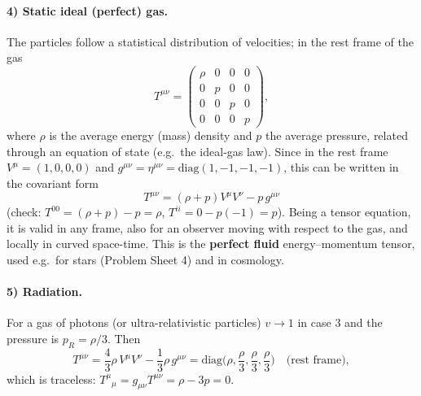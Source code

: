 \paragraph{4) Static ideal (perfect) gas.} The particles follow a statistical distribution of velocities; in the rest frame of the gas
\begin{equation}
  T^{\mu\nu}=\begin{pmatrix}\rho&0&0&0\\0&p&0&0\\0&0&p&0\\0&0&0&p\end{pmatrix},
\end{equation}
where $\rho$ is the average energy (mass) density and $p$ the average pressure, related through an equation of state (e.g.\ the ideal-gas law). Since in the rest frame $V^\mu=(1,0,0,0)$ and $g^{\mu\nu}=\eta^{\mu\nu}=\mathrm{diag}(1,-1,-1,-1)$, this can be written in the covariant form
\begin{equation}
  \boxed{T^{\mu\nu}=(\rho+p)V^\mu V^\nu-p\,g^{\mu\nu}}
\end{equation}
(check: $T^{00}=(\rho+p)-p=\rho$, $T^{ii}=0-p(-1)=p$). Being a tensor equation, it is valid in any frame, also for an observer moving with respect to the gas, and locally in curved space-time. This is the \textbf{perfect fluid} energy--momentum tensor, used e.g.\ for stars (Problem Sheet 4) and in cosmology.

\paragraph{5) Radiation.} For a gas of photons (or ultra-relativistic particles) $v\to1$ in case 3 and the pressure is $p_R=\rho/3$. Then
\begin{equation}
  T^{\mu\nu}=\frac43\rho\,V^\mu V^\nu-\frac13\rho\,g^{\mu\nu}=\mathrm{diag}\Big(\rho,\frac\rho3,\frac\rho3,\frac\rho3\Big)\quad\text{(rest frame)},
\end{equation}
which is traceless: $T^\mu{}_\mu=g_{\mu\nu}T^{\mu\nu}=\rho-3p=0$.
